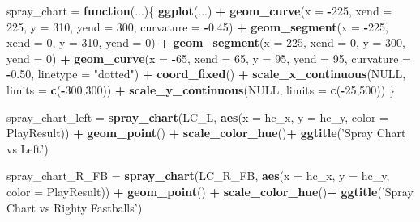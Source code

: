 \documentclass[]{article}
\newenvironment{Shaded}{\begin{snugshade}}{\end{snugshade}}
\newcommand{\KeywordTok}[1]{\textcolor[rgb]{0.13,0.29,0.53}{\textbf{#1}}}
\newcommand{\DataTypeTok}[1]{\textcolor[rgb]{0.13,0.29,0.53}{#1}}
\newcommand{\DecValTok}[1]{\textcolor[rgb]{0.00,0.00,0.81}{#1}}
\newcommand{\FloatTok}[1]{\textcolor[rgb]{0.00,0.00,0.81}{#1}}
\newcommand{\StringTok}[1]{\textcolor[rgb]{0.31,0.60,0.02}{#1}}
\newcommand{\OtherTok}[1]{\textcolor[rgb]{0.56,0.35,0.01}{#1}}
\newcommand{\ControlFlowTok}[1]{\textcolor[rgb]{0.13,0.29,0.53}{\textbf{#1}}}
\newcommand{\OperatorTok}[1]{\textcolor[rgb]{0.81,0.36,0.00}{\textbf{#1}}}
\newcommand{\NormalTok}[1]{#1}
\begin{document}
\begin{Shaded}
\begin{Highlighting}[]
\NormalTok{spray_chart =}\StringTok{ }\ControlFlowTok{function}\NormalTok{(...)\{}
  \KeywordTok{ggplot}\NormalTok{(...) }\OperatorTok{+}\StringTok{ }
\StringTok{    }\KeywordTok{geom_curve}\NormalTok{(}\DataTypeTok{x =} \OperatorTok{-}\DecValTok{225}\NormalTok{, }\DataTypeTok{xend =} \DecValTok{225}\NormalTok{, }\DataTypeTok{y =} \DecValTok{310}\NormalTok{, }\DataTypeTok{yend =} \DecValTok{300}\NormalTok{, }\DataTypeTok{curvature =} \OperatorTok{-}\FloatTok{0.45}\NormalTok{) }\OperatorTok{+}\StringTok{ }
\StringTok{    }\KeywordTok{geom_segment}\NormalTok{(}\DataTypeTok{x =} \OperatorTok{-}\DecValTok{225}\NormalTok{, }\DataTypeTok{xend =} \DecValTok{0}\NormalTok{, }\DataTypeTok{y =} \DecValTok{310}\NormalTok{, }\DataTypeTok{yend =} \DecValTok{0}\NormalTok{) }\OperatorTok{+}
\StringTok{    }\KeywordTok{geom_segment}\NormalTok{(}\DataTypeTok{x =}  \DecValTok{225}\NormalTok{, }\DataTypeTok{xend =} \DecValTok{0}\NormalTok{, }\DataTypeTok{y =} \DecValTok{300}\NormalTok{, }\DataTypeTok{yend =} \DecValTok{0}\NormalTok{) }\OperatorTok{+}\StringTok{ }
\StringTok{    }\KeywordTok{geom_curve}\NormalTok{(}\DataTypeTok{x =} \OperatorTok{-}\DecValTok{65}\NormalTok{, }\DataTypeTok{xend =} \DecValTok{65}\NormalTok{, }\DataTypeTok{y =} \DecValTok{95}\NormalTok{, }\DataTypeTok{yend =} \DecValTok{95}\NormalTok{, }\DataTypeTok{curvature =} \OperatorTok{-}\FloatTok{0.50}\NormalTok{, }\DataTypeTok{linetype =} \StringTok{"dotted"}\NormalTok{) }\OperatorTok{+}
\StringTok{    }\KeywordTok{coord_fixed}\NormalTok{() }\OperatorTok{+}
\StringTok{    }\KeywordTok{scale_x_continuous}\NormalTok{(}\OtherTok{NULL}\NormalTok{, }\DataTypeTok{limits =} \KeywordTok{c}\NormalTok{(}\OperatorTok{-}\DecValTok{300}\NormalTok{,}\DecValTok{300}\NormalTok{)) }\OperatorTok{+}\StringTok{ }
\StringTok{    }\KeywordTok{scale_y_continuous}\NormalTok{(}\OtherTok{NULL}\NormalTok{, }\DataTypeTok{limits =} \KeywordTok{c}\NormalTok{(}\OperatorTok{-}\DecValTok{25}\NormalTok{,}\DecValTok{500}\NormalTok{))}
\NormalTok{\}}

\NormalTok{spray_chart_left =}\StringTok{ }\KeywordTok{spray_chart}\NormalTok{(LC_L, }\KeywordTok{aes}\NormalTok{(}\DataTypeTok{x =}\NormalTok{ hc_x, }\DataTypeTok{y =}\NormalTok{ hc_y, }\DataTypeTok{color =}\NormalTok{ PlayResult)) }\OperatorTok{+}
\StringTok{  }\KeywordTok{geom_point}\NormalTok{() }\OperatorTok{+}
\StringTok{  }\KeywordTok{scale_color_hue}\NormalTok{()}\OperatorTok{+}
\StringTok{  }\KeywordTok{ggtitle}\NormalTok{(}\StringTok{'Spray Chart vs Left'}\NormalTok{)}

\NormalTok{spray_chart_R_FB =}\StringTok{ }\KeywordTok{spray_chart}\NormalTok{(LC_R_FB, }\KeywordTok{aes}\NormalTok{(}\DataTypeTok{x =}\NormalTok{ hc_x, }\DataTypeTok{y =}\NormalTok{ hc_y, }\DataTypeTok{color =}\NormalTok{ PlayResult)) }\OperatorTok{+}
\StringTok{  }\KeywordTok{geom_point}\NormalTok{() }\OperatorTok{+}
\StringTok{  }\KeywordTok{scale_color_hue}\NormalTok{()}\OperatorTok{+}
\StringTok{  }\KeywordTok{ggtitle}\NormalTok{(}\StringTok{'Spray Chart vs Righty Fastballs'}\NormalTok{)}


\end{Highlighting}
\end{Shaded}
\end{document}
